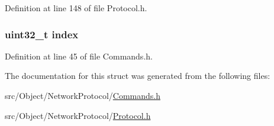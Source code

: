 Definition at line 148 of file Protocol.h.

\hypertarget{struct_outpoint_aafd95f8c7a99b9189ede7cdf0871ebe8}{
\subsubsection[{index}]{\setlength{\rightskip}{0pt plus 5cm}uint32\_\-t {\bf index}}}
\label{struct_outpoint_aafd95f8c7a99b9189ede7cdf0871ebe8}


Definition at line 45 of file Commands.h.



The documentation for this struct was generated from the following files:\begin{DoxyCompactItemize}
\item 
src/Object/NetworkProtocol/\hyperlink{_commands_8h}{Commands.h}\item 
src/Object/NetworkProtocol/\hyperlink{_protocol_8h}{Protocol.h}\end{DoxyCompactItemize}
